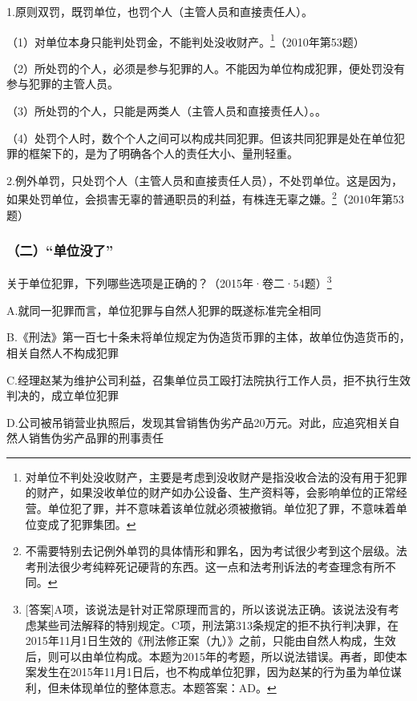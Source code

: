 1.原则双罚，既罚单位，也罚个人（主管人员和直接责任人）。

（1）对单位本身只能判处罚金，不能判处没收财产。\footnote{对单位不判处没收财产，主要是考虑到没收财产是指没收合法的没有用于犯罪的财产，如果没收单位的财产如办公设备、生产资料等，会影响单位的正常经营。单位犯了罪，并不意味着该单位就必须被撤销。单位犯了罪，不意味着单位变成了犯罪集团。}（2010年第53题）

（2）所处罚的个人，必须是参与犯罪的人。不能因为单位构成犯罪，便处罚没有参与犯罪的主管人员。

（3）所处罚的个人，只能是两类人（主管人员和直接责任人）。。

（4）处罚个人时，数个个人之间可以构成共同犯罪。但该共同犯罪是处在单位犯罪的框架下的，是为了明确各个人的责任大小、量刑轻重。

2.例外单罚，只处罚个人（主管人员和直接责任人员），不处罚单位。这是因为，如果处罚单位，会损害无辜的普通职员的利益，有株连无辜之嫌。\footnote{不需要特别去记例外单罚的具体情形和罪名，因为考试很少考到这个层级。法考刑法很少考纯粹死记硬背的东西。这一点和法考刑诉法的考查理念有所不同。}（2010年第53题）

\subsubsection*{（二）“单位没了”}



关于单位犯罪，下列哪些选项是正确的？（2015年·卷二·54题）\footnote{[答案]A项，该说法是针对正常原理而言的，所以该说法正确。该说法没有考虑某些司法解释的特别规定。C项，刑法第313条规定的拒不执行判决罪，在2015年11月1日生效的《刑法修正案（九）》之前，只能由自然人构成，生效后，则可以由单位构成。本题为2015年的考题，所以说法错误。再者，即使本案发生在2015年11月1日后，也不构成单位犯罪，因为赵某的行为虽为单位谋利，但未体现单位的整体意志。本题答案：AD。}

A.就同一犯罪而言，单位犯罪与自然人犯罪的既遂标准完全相同

B.《刑法》第一百七十条未将单位规定为伪造货币罪的主体，故单位伪造货币的，相关自然人不构成犯罪

C.经理赵某为维护公司利益，召集单位员工殴打法院执行工作人员，拒不执行生效判决的，成立单位犯罪

D.公司被吊销营业执照后，发现其曾销售伪劣产品20万元。对此，应追究相关自然人销售伪劣产品罪的刑事责任

